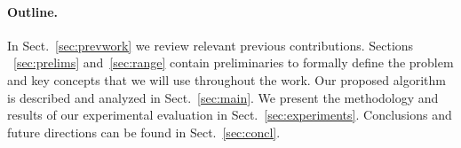 %
%

\paragraph*{Outline.} %
In Sect.~\ref{sec:prevwork} we review relevant previous contributions.
Sections ~\ref{sec:prelims} and~\ref{sec:range} contain preliminaries to
formally define the problem and key concepts that we will use throughout the
work. Our proposed algorithm is described and analyzed in Sect.~\ref{sec:main}.
We present the methodology and results of our experimental evaluation %
in Sect.~\ref{sec:experiments}. Conclusions and future directions can be found %
in Sect.~\ref{sec:concl}. 

